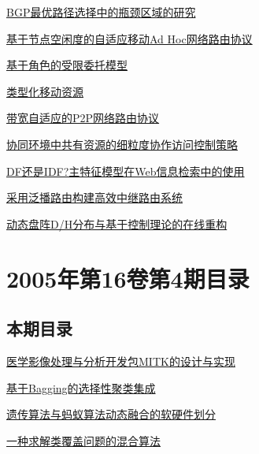 \documentclass[a4paper]{article}
\begin{document}
\href{http://www.jos.org.cn/ch/reader/download_pdf.aspx?file_no=20050535&year_id=2005&quarter_id=5&falg=1}{BGP最优路径选择中的瓶颈区域的研究}

\href{http://www.jos.org.cn/ch/reader/download_pdf.aspx?file_no=20050536&year_id=2005&quarter_id=5&falg=1}{基于节点空闲度的自适应移动Ad Hoc网络路由协议}

\href{http://www.jos.org.cn/ch/reader/download_pdf.aspx?file_no=20050537&year_id=2005&quarter_id=5&falg=1}{基于角色的受限委托模型}

\href{http://www.jos.org.cn/ch/reader/download_pdf.aspx?file_no=20050538&year_id=2005&quarter_id=5&falg=1}{类型化移动资源}

\href{http://www.jos.org.cn/ch/reader/download_pdf.aspx?file_no=20050539&year_id=2005&quarter_id=5&falg=1}{带宽自适应的P2P网络路由协议}

\href{http://www.jos.org.cn/ch/reader/download_pdf.aspx?file_no=20050540&year_id=2005&quarter_id=5&falg=1}{协同环境中共有资源的细粒度协作访问控制策略}

\href{http://www.jos.org.cn/ch/reader/download_pdf.aspx?file_no=20050541&year_id=2005&quarter_id=5&falg=1}{DF还是IDF?主特征模型在Web信息检索中的使用}

\href{http://www.jos.org.cn/ch/reader/download_pdf.aspx?file_no=20050542&year_id=2005&quarter_id=5&falg=1}{采用泛播路由构建高效中继路由系统}

\href{http://www.jos.org.cn/ch/reader/download_pdf.aspx?file_no=20050543&year_id=2005&quarter_id=5&falg=1}{动态盘阵D/H分布与基于控制理论的在线重构}


\section{\textbf{2005年第16卷第4期目录}}
\subsection{本期目录}
\href{http://www.jos.org.cn/ch/reader/download_pdf.aspx?file_no=20050401&year_id=2005&quarter_id=4&falg=1}{医学影像处理与分析开发包MITK的设计与实现}

\href{http://www.jos.org.cn/ch/reader/download_pdf.aspx?file_no=20050402&year_id=2005&quarter_id=4&falg=1}{基于Bagging的选择性聚类集成}

\href{http://www.jos.org.cn/ch/reader/download_pdf.aspx?file_no=20050403&year_id=2005&quarter_id=4&falg=1}{遗传算法与蚂蚁算法动态融合的软硬件划分}

\href{http://www.jos.org.cn/ch/reader/download_pdf.aspx?file_no=20050404&year_id=2005&quarter_id=4&falg=1}{一种求解类覆盖问题的混合算法}
\end{document}
